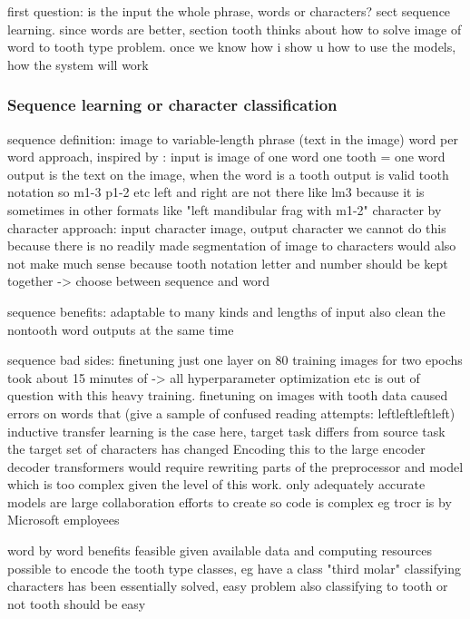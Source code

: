 \documentclass{article}
\begin{document}
first question: is the input the whole phrase, words or characters? sect sequence learning. 
since words are better, section tooth thinks about how to solve image of word to tooth type problem.
once we know how i show u how to use the models, how the system will work

\subsubsection{Sequence learning or character classification}

sequence definition: image to variable-length phrase (text in the image)
word per word approach, inspired by \cite{tibetan_ocr}:
    input is image of one word
        one tooth = one word
    output is the text on the image, when the word is a tooth output is valid tooth notation so m1-3 p1-2 etc
        left and right are not there like lm3 because it is sometimes in other formats like "left mandibular frag with m1-2"
character by character approach: input character image, output character 
    we cannot do this because there is no readily made segmentation of image to characters 
    would also not make much sense because tooth notation letter and number should be kept together
    -> choose between sequence and word

sequence benefits:
    adaptable to many kinds and lengths of input
    also clean the nontooth word outputs at the same time

sequence bad sides:
    finetuning just one layer on 80 training images for two epochs took about 15 minutes of \cite{li2021trocr}
        -> all hyperparameter optimization etc is out of question with this heavy training.
    finetuning on images with tooth data caused errors on words that 
        (give a sample of confused reading attempts: leftleftleftleft)
    inductive transfer learning is the case here, target task differs from source task
        the target set of characters has changed
            Encoding this to the large encoder decoder transformers would 
            require rewriting parts of the preprocessor and model which is too complex given the level of this work.
                only adequately accurate models are large collaboration efforts to create so code is complex 
                eg trocr is by Microsoft employees

word by word benefits
feasible given available data and computing resources
possible to encode the tooth type classes, eg have a class "third molar"
classifying characters has been essentially solved, easy problem 
also classifying to tooth or not tooth should be easy 
\end{document}
